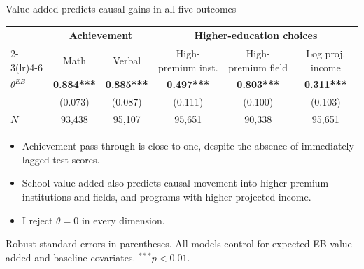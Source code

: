 \documentclass[11pt,aspectratio=169]{beamer}
\newenvironment{wideitemize}{%
  \begin{minipage}{0.92\textwidth}
  \begin{itemize}
  \addtolength{\itemsep}{0.85em}
}{%
  \end{itemize}
  \end{minipage}
}
\begin{document}
\begin{frame}{Value added predicts causal gains in all five outcomes}
\centering
\scriptsize
\setlength{\tabcolsep}{6pt}
\begin{tabular}{lccccc}
\toprule
 & \multicolumn{2}{c}{Achievement} & \multicolumn{3}{c}{Higher-education choices} \\
\cmidrule(lr){2-3}\cmidrule(lr){4-6}
 & Math & Verbal & High-premium inst. & High-premium field & Log proj. income \\
\midrule
$\theta^{EB}$
  & \textbf{0.884***}
  & \textbf{0.885***}
  & \textbf{0.497***}
  & \textbf{0.803***}
  & \textbf{0.311***} \\
 & (0.073) & (0.087) & (0.111) & (0.100) & (0.103) \\
$N$ & 93,438 & 95,107 & 95,651 & 90,338 & 95,651 \\
\bottomrule
\end{tabular}

\vspace{1em}
\begin{wideitemize}
  \item Achievement pass-through is close to one, despite the absence of immediately lagged test scores.
  \item School value added also predicts causal movement into higher-premium institutions and fields, and programs with higher projected income.
  \item I reject $\theta=0$ in every dimension.
\end{wideitemize}

\vspace{-0.2em}
\tiny Robust standard errors in parentheses. All models control for expected EB value added and baseline covariates. $^{***}p<0.01$.
\end{frame}
\end{document}
